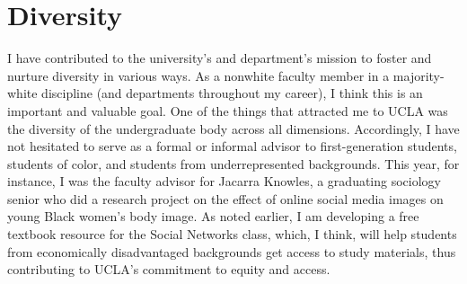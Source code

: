 \documentclass[a4paper,11pt]{extarticle}
\begin{document}
\section*{Diversity}
I have contributed to the university's and department's mission to foster and nurture diversity in various ways. As a nonwhite faculty member in a majority-white discipline (and departments throughout my career), I think this is an important and valuable goal. One of the things that attracted me to UCLA was the diversity of the undergraduate body across all dimensions. Accordingly, I have not hesitated to serve as a formal or informal advisor to first-generation students, students of color, and students from underrepresented backgrounds. This year, for instance, I was the faculty advisor for Jacarra Knowles, a graduating sociology senior who did a research project on the effect of online social media images on young Black women's body image. As noted earlier, I am developing a free textbook resource for the Social Networks class, which, I think, will help students from economically disadvantaged backgrounds get access to study materials, thus contributing to UCLA's commitment to equity and access.
\end{document}

